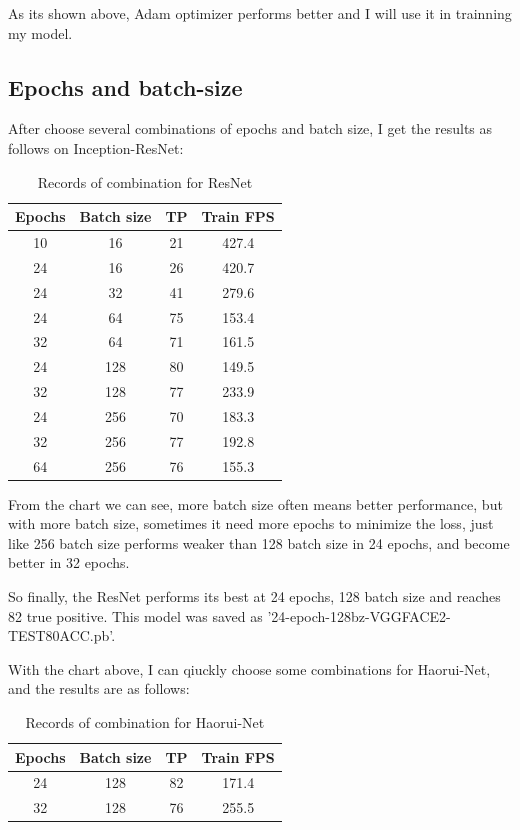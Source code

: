 \documentclass{article}
\begin{document}
As its shown above, Adam optimizer performs better and I will use it in trainning my model.
\subsection{Epochs and batch-size}
After choose several combinations of epochs and batch size,  I get the results as follows on Inception-ResNet:

\begin{table}[!htbp]
\centering
\caption{Records of combination for ResNet}\label{tab:aStrangeTable}%
\begin{tabular}{cccc}
\toprule
Epochs & Batch size& TP &Train FPS\\
\midrule
10& 16 & 21 & 427.4\\
24& 16& 26 & 420.7\\
24 & 32 & 41 & 279.6\\
24 & 64 & 75 & 153.4\\
32 & 64 & 71 & 161.5\\
24 & 128 & 80 & 149.5\\
32 & 128 & 77 & 233.9\\
24 & 256 & 70  &183.3\\
32 & 256 & 77  &192.8\\
64 & 256 & 76  &155.3\\
\bottomrule
\end{tabular}

\end{table}
From the chart we can see, more batch size often means better performance, but with more batch size, sometimes it need more epochs to minimize the loss, just like 256 batch size performs weaker than 128 batch size in 24 epochs, and become better in 32 epochs.

So finally, the ResNet performs its best at 24 epochs, 128 batch size and reaches 82 true positive. This model was saved as  '24-epoch-128bz-VGGFACE2-TEST80ACC.pb'.

With the chart above, I can qiuckly choose some combinations for Haorui-Net, and the results are as follows:

\begin{table}[!htbp]
\centering
\caption{Records of combination for Haorui-Net}\label{tab:aStrangeTable}%
\begin{tabular}{cccc}
\toprule
Epochs & Batch size& TP &Train FPS\\
\midrule
24 & 128 & 82 & 171.4\\
32 & 128 & 76 & 255.5\\
\bottomrule
\end{tabular}
\end{table}
\end{document}
